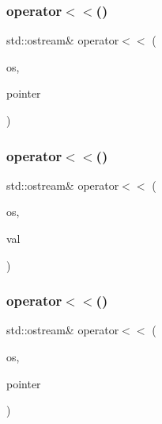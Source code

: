 \subsubsection{\texorpdfstring{operator$<$$<$()}{operator<<()}\hspace{0.1cm}{\footnotesize\ttfamily [3/5]}}
{\footnotesize\ttfamily std\+::ostream\& operator$<$$<$ (\begin{DoxyParamCaption}\item[{std\+::ostream \&}]{os,  }\item[{const \mbox{\hyperlink{class_base}{Base}} $\ast$}]{pointer }\end{DoxyParamCaption})}

\mbox{\label{_obj__test_2lib_2googletest-release-1_88_81_2googletest_2test_2gtest__unittest_8cc_ab3cbb7adaeba5049e2c1907523f0c3e8}} 
\subsubsection{\texorpdfstring{operator$<$$<$()}{operator<<()}\hspace{0.1cm}{\footnotesize\ttfamily [4/5]}}
{\footnotesize\ttfamily std\+::ostream\& operator$<$$<$ (\begin{DoxyParamCaption}\item[{std\+::ostream \&}]{os,  }\item[{const \mbox{\hyperlink{classnamespace2_1_1_my_type_in_name_space2}{namespace2\+::\+My\+Type\+In\+Name\+Space2}} \&}]{val }\end{DoxyParamCaption})}

\mbox{\label{_obj__test_2lib_2googletest-release-1_88_81_2googletest_2test_2gtest__unittest_8cc_a839d8a189a0c52bb7899a5b4b4b07ed1}} 
\subsubsection{\texorpdfstring{operator$<$$<$()}{operator<<()}\hspace{0.1cm}{\footnotesize\ttfamily [5/5]}}
{\footnotesize\ttfamily std\+::ostream\& operator$<$$<$ (\begin{DoxyParamCaption}\item[{std\+::ostream \&}]{os,  }\item[{const \mbox{\hyperlink{classnamespace2_1_1_my_type_in_name_space2}{namespace2\+::\+My\+Type\+In\+Name\+Space2}} $\ast$}]{pointer }\end{DoxyParamCaption})}

